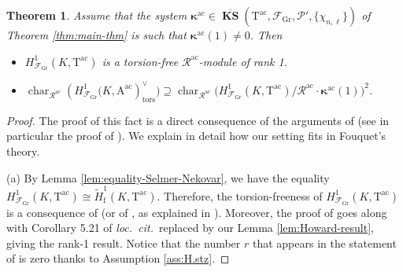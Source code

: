 \documentclass[12pt,reqno]{amsart}
\newtheorem{theorem}{Theorem}[section]
\theoremstyle{definition}
\theoremstyle{remark}
\newcommand{\T}{\boldsymbol{\mathrm{T}}}
\newcommand{\calR}{\mathcal{R}}
\newcommand{\A}{\boldsymbol{\mathrm{A}}}
\DeclareMathOperator{\Char}{char}
\DeclareMathOperator{\ks}{KS}
\newcommand{\KS}{\boldsymbol{\ks}}
\newcommand{\ac}{\mathrm{ac}}
\newcommand{\Gr}{\mathrm{Gr}}
\newcommand{\f}{\mathrm{f}}
\newcommand{\tors}{\mathrm{tors}}
\newcommand{\gk}{\kappa}
\begin{document}
\begin{theorem}\label{thm:iwasawa-main-conjecture}
    Assume that the system $\boldsymbol{\gk}^\ac\in \overline{\KS}(\T^\ac,\mathcal{F}_\Gr,\mathcal{P}',\{\chi_{n,\ell}\})$ of Theorem \ref{thm:main-thm} is such that $\boldsymbol{\gk}^{\ac}(1)\ne 0$. Then  
    \begin{itemize}
        \item[(a)] $H^1_{\mathcal{F}_\Gr}(K,\T^\ac)$ is a torsion-free  $\calR^\ac$-module of rank 1.
        \item[(b)] $\Char_{\calR^\ac}(H^1_{\mathcal{F}_\Gr}\big(K,\A^\ac)^\vee_{\tors}\big)\supseteq \Char_{\calR^\ac}\big(H^1_{\mathcal{F}_\Gr}(K,\T^{\ac})/\calR^\ac\cdot \boldsymbol{\gk}^\ac(1)\big)^2$.
    \end{itemize}
\end{theorem}
\begin{proof}
    The proof of this fact is a direct consequence of the arguments of \cite[§6]{Fouquet13:Dihedral} (see in particular the proof of \cite[Theorem 6.3]{Fouquet13:Dihedral}). We explain in detail how our setting fits in Fouquet's theory.
    
    
    (a) By Lemma \ref{lem:equality-Selmer-Nekovar}, we have the equality $H^1_{\mathcal{F}_\Gr}(K,\T^\ac)\cong \tilde{H}^1_\f(K,\T^\ac)$. Therefore, the torsion-freeness of $H^1_{\mathcal{F}_\Gr}(K,\T^\ac)$ is a consequence of \cite[Proposition 6.2.(i)]{Fouquet13:Dihedral} (or of \cite[§1.3.3]{Perrin-Riou:p-adic-L-functions-and-p-adic-representations}, as explained in \cite[Lemma 3.3]{Castella-Wan:iwasawa-main-conjecture-for-GL2}). Moreover, the proof of \cite[Proposition 6.5]{Fouquet13:Dihedral} goes along with Corollary 5.21 of \textit{loc.~cit.}~replaced by our Lemma \ref{lem:Howard-result}, giving the rank-1 result. Notice that the number $r$ that appears in the statement of \cite[Proposition 6.2.(i)]{Fouquet13:Dihedral} is zero thanks to Assumption \ref{ass:H.stz}.


\end{proof}
\end{document}
